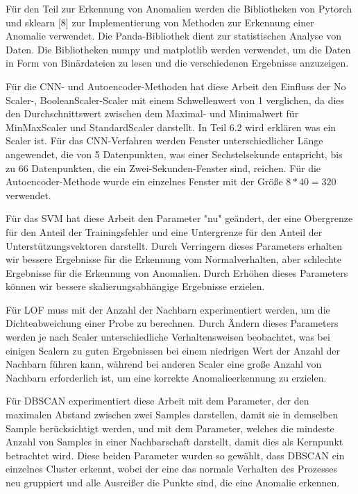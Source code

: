 \documentclass[12pt,a4paper]{scrartcl}
\numberwithin{equation}{section}
\begin{document}

Für den Teil zur Erkennung von Anomalien werden die Bibliotheken von Pytorch\footnotemark{} und sklearn [8] zur Implementierung von Methoden zur Erkennung einer Anomalie verwendet. Die Panda-Bibliothek dient zur statistischen Analyse von Daten. Die Bibliotheken numpy und matplotlib werden verwendet, um die Daten in Form von Binärdateien zu lesen und die verschiedenen Ergebnisse anzuzeigen.


Für die CNN- und Autoencoder-Methoden hat diese Arbeit den Einfluss der No Scaler-, BooleanScaler-Scaler mit einem Schwellenwert von 1 verglichen, da dies den Durchschnittswert zwischen dem Maximal- und Minimalwert für MinMaxScaler und StandardScaler darstellt. In Teil 6.2 wird erklären was ein Scaler ist. Für das CNN-Verfahren werden Fenster unterschiedlicher Länge angewendet, die von 5 Datenpunkten, was einer Sechstelsekunde entspricht, bis zu 66 Datenpunkten, die ein Zwei-Sekunden-Fenster sind, reichen.
Für die Autoencoder-Methode wurde ein einzelnes Fenster mit der Größe $8*40 = 320$ verwendet. 

Für das SVM hat diese Arbeit den Parameter "nu" geändert, der eine Obergrenze für den Anteil der Trainingsfehler und eine Untergrenze für den Anteil der Unterstützungsvektoren darstellt. Durch Verringern dieses Parameters erhalten wir bessere Ergebnisse für die Erkennung vom Normalverhalten, aber schlechte Ergebnisse für die Erkennung von Anomalien. Durch Erhöhen dieses Parameters können wir bessere skalierungsabhängige Ergebnisse erzielen.

Für LOF muss mit der Anzahl der Nachbarn experimentiert werden, um die Dichteabweichung einer Probe zu berechnen. Durch Ändern dieses Parameters werden je nach Scaler unterschiedliche Verhaltensweisen beobachtet, was bei einigen Scalern zu guten Ergebnissen bei einem niedrigen Wert der Anzahl der Nachbarn führen kann, während bei anderen Scaler eine große Anzahl von Nachbarn erforderlich ist, um eine korrekte Anomalieerkennung zu erzielen.

Für DBSCAN experimentiert diese Arbeit mit dem Parameter, der den maximalen Abstand zwischen zwei Samples darstellen, damit sie in demselben Sample berücksichtigt werden, und mit dem Parameter, welches die mindeste Anzahl von Samples in einer Nachbarschaft darstellt, damit dies als Kernpunkt betrachtet wird. Diese beiden Parameter wurden so gewählt, dass DBSCAN ein einzelnes Cluster erkennt, wobei der eine das normale Verhalten des Prozesses neu gruppiert und alle Ausreißer die Punkte sind, die eine Anomalie erkennen.
\end{document}
